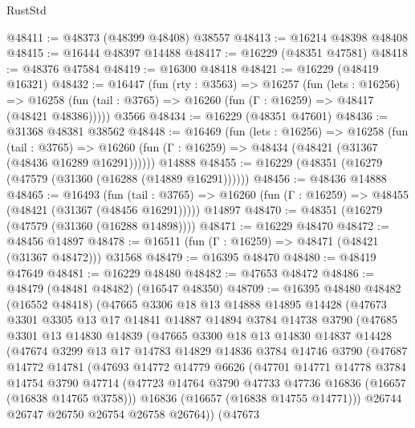 \begin{lexlean}{RustStd}
\begin{coremodule}
@48411 := @48373 (@48399 @48408) @38557
@48413 := @16214 @48398 @48408
@48415 := @16444 @48397 @14488
@48417 := @16229 (@48351 @47581)
@48418 := @48376 @47584
@48419 := @16300 @48418
@48421 := @16229 (@48419 @16321)
@48432 := @16447
    (fun (rty : @3563) =>
    @16257
      (fun (lets : @16256) =>
      @16258 (fun (tail : @3765) => @16260 (fun (Γ : @16259) => @48417 (@48421 @48386)))))
    @3566
@48434 := @16229 (@48351 @47601)
@48436 := @31368 @48381 @38562
@48448 := @16469
    (fun (lets : @16256) =>
    @16258
      (fun (tail : @3765) =>
      @16260 (fun (Γ : @16259) => @48434 (@48421 (@31367 (@48436 @16289 @16291))))))
    @14888
@48455 := @16229 (@48351 (@16279 (@47579 (@31360 (@16288 (@14889 @16291))))))
@48456 := @48436 @14888
@48465 := @16493
    (fun (tail : @3765) => @16260 (fun (Γ : @16259) => @48455 (@48421 (@31367 (@48456 @16291)))))
    @14897
@48470 := @48351 (@16279 (@47579 (@31360 (@16288 @14898))))
@48471 := @16229 @48470
@48472 := @48456 @14897
@48478 := @16511 (fun (Γ : @16259) => @48471 (@48421 (@31367 @48472))) @31568
@48479 := @16395 @48470
@48480 := @48419 @47649
@48481 := @16229 @48480
@48482 := @47653 @48472
@48486 := @48479 (@48481 @48482) (@16547 @48350)
@48709 := @16395
    @48480
    @48482
    (@16552 @48418)
    (@47665
      @3306
      @18
      @13
      @14888
      @14895
      @14428
      (@47673
        @3301
        @3305
        @13
        @17
        @14841
        @14887
        @14894
        @3784
        @14738
        @3790
        (@47685
          @3301
          @13
          @14830
          @14839
          (@47665
            @3300
            @18
            @13
            @14830
            @14837
            @14428
            (@47674
              @3299
              @13
              @17
              @14783
              @14829
              @14836
              @3784
              @14746
              @3790
              (@47687
                @14772
                @14781
                (@47693
                  @14772
                  @14779
                  @6626
                  (@47701
                    @14771
                    @14778
                    @3784
                    @14754
                    @3790
                    @47714
                    (@47723 @14764 @3790 @47733 @47736 @16836 (@16657 (@16838 @14765 @3758)))
                    @16836
                    (@16657 (@16838 @14755 @14771)))
                  @26744
                  @26747
                  @26750
                  @26754
                  @26758
                  @26764))
              (@47673

\end{coremodule}
\end{lexlean}

